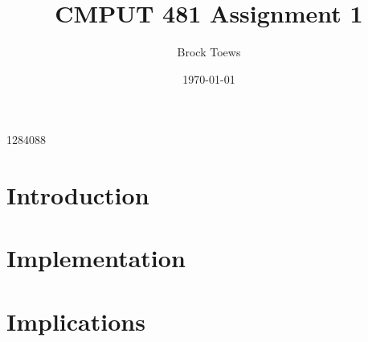\documentclass[11pt]{article}
\title{CMPUT 481 Assignment 1}
\author{Brock Toews}
\date{\today}
\begin{document}
\maketitle
\begin{center}
1284088
\end{center}
\thispagestyle{empty}
\pagebreak
\setcounter{page}{1}
\section{Introduction}

\section{Implementation}
\section{Implications}
\end{document}
